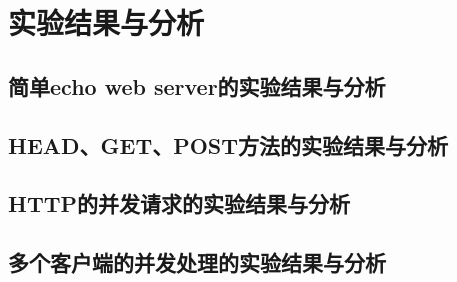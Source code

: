 \setmonofont{TeX Gyre Cursor}   %
\chapter{实验结果与分析}
\section{简单echo web server的实验结果与分析}


\section{HEAD、GET、POST方法的实验结果与分析}


\section{HTTP的并发请求的实验结果与分析}


\section{多个客户端的并发处理的实验结果与分析}

